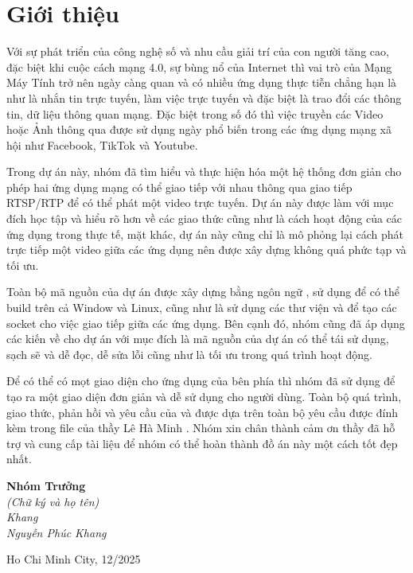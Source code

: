 \section*{Giới thiệu}
Với sự phát triển của công nghệ số và nhu cầu giải trí của con người tăng cao, đặc biệt khi cuộc cách mạng 4.0, sự bùng nổ của Internet thì vai trò của Mạng Máy Tính trở nên ngày càng quan và có nhiều ứng dụng thực tiễn chẳng hạn là như là nhắn tin trực tuyến, làm việc trực tuyến và đặc biệt là trao đổi các thông tin, dữ liệu thông quan mạng. Đặc biệt trong số đó thì việc truyền các Video hoặc Ảnh thông qua được sử dụng ngày phổ biến trong các ứng dụng mạng xã hội như Facebook, TikTok và Youtube. 

Trong dự án này, nhóm đã tìm hiểu và thực hiện hóa một hệ thống đơn giản cho phép hai ứng dụng mạng có thể giao tiếp với nhau thông qua giao tiếp RTSP/RTP để có thể phát một video trực tuyến. Dự án này được làm với mục đích học tập và hiểu rõ hơn về các giao thức cũng như là cách hoạt động của các ứng dụng trong thực tế, mặt khác, dự án này cũng chỉ là mô phỏng lại cách phát trực tiếp một video giữa các ứng dụng nên được xây dựng không quá phức tạp và tối ưu.

Toàn bộ mã nguồn của dự án được xây dựng bằng ngôn ngữ , sử dụng  để có thể build trên cả Window và Linux, cũng như là sử dụng các thư viện  và  để tạo các socket cho việc giao tiếp giữa các ứng dụng. Bên cạnh đó, nhóm cũng đã áp dụng các kiến về  cho dự án với mục đích là mã nguồn của dự án có thể tái sử dụng, sạch sẽ và dễ đọc, dễ sửa lỗi cũng như là tối ưu trong quá trình hoạt động.

Để có thể có mọt giao diện cho ứng dụng của bên phía  thì nhóm đã sử dụng  để tạo ra một giao diện đơn giản và dễ sử dụng cho người dùng. Toàn bộ quá trình, giao thức, phản hồi và yêu cầu của  và  được dựa trên toàn bộ yêu cầu được đính kèm trong file  của thầy Lê Hà Minh \cite{lehaminh2024socket}. Nhóm xin chân thành cảm ơn thầy đã hỗ trợ và cung cấp tài liệu để nhóm có thể hoàn thành đồ án này một cách tốt đẹp nhất.

\begin{flushright}
\begin{minipage}{0.3\textwidth}
\centering 
\textbf{Nhóm Trưởng}\\
\textit{(Chữ ký và họ tên)}\\[0.5cm]
\textit{\large Khang}\\  
\textit{Nguyễn Phúc Khang}\\
\end{minipage}
\hspace{1cm}
\end{flushright}
\vspace{2cm}
\begin{center} {\footnotesize Ho Chi Minh City, 12/2025}
\end{center}
\newpage